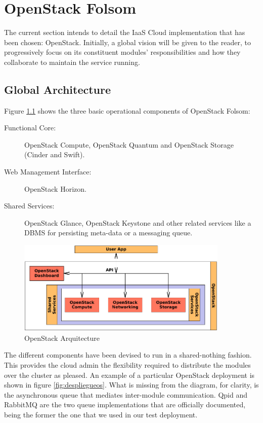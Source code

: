 \chapter{OpenStack Folsom}\label{cap:openstack}
\noindent The current section intends to detail the IaaS Cloud implementation that has been chosen: OpenStack. Initially, a global vision will be given to the reader, to progressively focus on its constituent modules' responsibilities and how they collaborate to maintain the service running.

\section{Global Architecture}\label{sec:arquitecturaglobal}
\noindent Figure \ref{fig:arquitecturaos} shows the three basic operational components of OpenStack Folsom:

\begin{description}
 \item[Functional Core:] OpenStack Compute, OpenStack Quantum and OpenStack Storage (Cinder and Swift).
 \item[Web Management Interface:] OpenStack Horizon.
 \item[Shared Services:] OpenStack Glance, OpenStack Keystone and other related services like a DBMS for persisting meta-data or a messaging queue.
\end{description}

\begin{figure}[tbp]
\begin{center}
\includegraphics[width=0.9\textwidth]{imagenes/012.pdf}
 \caption{OpenStack Arquitecture}
\label{fig:arquitecturaos}
\end{center}
\end{figure}

The different components have been devised to run in a shared-nothing fashion. This provides the cloud admin the flexibility required to distribute the modules over the cluster as pleased. An example of a particular OpenStack deployment is shown in figure \ref{fig:despliegueos}. What is missing from the diagram, for clarity, is the asynchronous queue that mediates inter-module communication. Qpid and RabbitMQ are the two queue implementations that are officially documented, being the former the one that we used in our test deployment.

